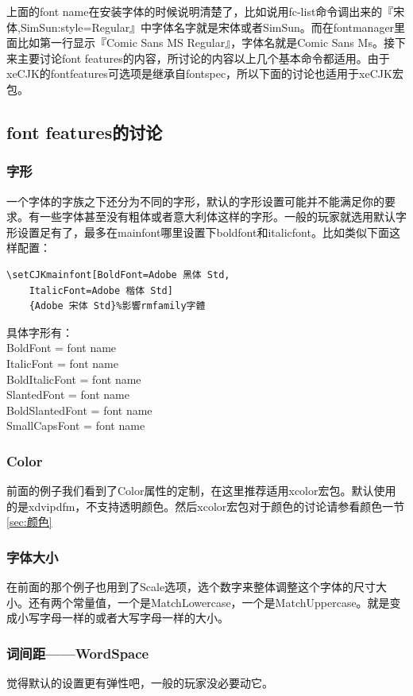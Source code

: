 \documentclass[12pt,oneside]{book}
\begin{document}
\begin{common-format}
上面的font name在安装字体的时候说明清楚了，比如说用fc-list命令调出来的『宋体,SimSun:style=Regular』中字体名字就是宋体或者SimSun。而在fontmanager里面比如第一行显示『Comic Sans MS Regular』，字体名就是Comic Sans Ms。接下来主要讨论font features的内容，所讨论的内容以上几个基本命令都适用。由于xeCJK的fontfeatures可选项是继承自fontspec，所以下面的讨论也适用于xeCJK宏包。

\subsection{font features的讨论}
\subsubsection{字形}
一个字体的字族之下还分为不同的字形，默认的字形设置可能并不能满足你的要求。有一些字体甚至没有粗体或者意大利体这样的字形。一般的玩家就选用默认字形设置足有了，最多在mainfont哪里设置下boldfont和italicfont。比如类似下面这样配置：
\begin{Verbatim}
\setCJKmainfont[BoldFont=Adobe 黑体 Std,
    ItalicFont=Adobe 楷体 Std]
    {Adobe 宋体 Std}%影響rmfamily字體
\end{Verbatim}

具体字形有：\\
BoldFont = font name\\
ItalicFont = font name\\
BoldItalicFont = font name\\
SlantedFont = font name\\
BoldSlantedFont = font name\\
SmallCapsFont = font name



\subsubsection{Color}
前面的例子我们看到了Color属性的定制，在这里推荐适用xcolor宏包。\XeLaTeX 默认使用的是xdvipdfm，不支持透明颜色。然后xcolor宏包对于颜色的讨论请参看颜色一节\ref{sec:颜色}

\subsubsection{字体大小}
在前面的那个例子也用到了Scale选项，选个数字来整体调整这个字体的尺寸大小。还有两个常量值，一个是MatchLowercase，一个是MatchUppercase。就是变成小写字母一样的或者大写字母一样的大小。

\subsubsection{词间距——WordSpace}
觉得默认的设置更有弹性吧，一般的玩家没必要动它。


\end{common-format}
\end{document}

